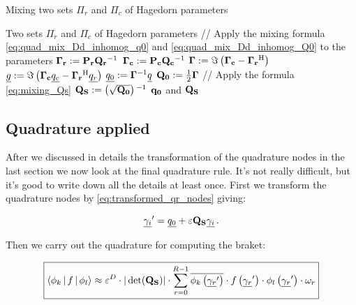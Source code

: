 \begin{algorithm}
\caption{Mixing two sets $\Pi_r$ and $\Pi_c$ of Hagedorn parameters}
\label{al:mixing_hagedorn_parameters}
\begin{algorithmic}
  \REQUIRE Two sets $\Pi_r$ and $\Pi_c$ of Hagedorn parameters
  \STATE // Apply the mixing formula  \eqref{eq:quad_mix_Dd_inhomog_q0} and \eqref{eq:quad_mix_Dd_inhomog_Q0} to the parameters
  \STATE $\mathbf{\Gamma_r} := \mathbf{P_r} \mathbf{Q_r}{}^{-1}$
  \STATE $\mathbf{\Gamma_c} := \mathbf{P_c} \mathbf{Q_c}{}^{-1}$
  \STATE $\mathbf{\Gamma} := \Im \left(\mathbf{\Gamma_c} - \mathbf{\Gamma_r}{}^{\textnormal{H}}\right)$
  \STATE $\underline{g} := \Im \left(\mathbf{\Gamma_c} \underline{q_c} - \mathbf{\Gamma_r}{}^{\textnormal{H}} \underline{q_r}\right)$
  \STATE $\underline{q_0} := \mathbf{\Gamma}{}^{-1} \underline{q}$
  \STATE $\mathbf{Q_0} := \frac{1}{2} \mathbf{\Gamma}$
  \STATE // Apply the formula \eqref{eq:mixing_Qs}
  \STATE $\mathbf{Q_S} := \left(\sqrt{\mathbf{Q_0}}\right){}^{-1}$
  \RETURN $\mathbf{q_0}$ and $\mathbf{Q_S}$
\end{algorithmic}
\end{algorithm}


\subsection{Quadrature applied}


After we discussed in details the transformation of the quadrature nodes in the
last section we now look at the final quadrature rule. It's not really difficult,
but it's good to write down all the details at least once. First we transform the
quadrature nodes by \eqref{eq:transformed_qr_nodes} giving:

\begin{equation} \label{eq:transform_qr_nodes}
  \underline{\gamma_i}^\prime = \underline{q_0} + \varepsilon \mathbf{Q_S} \underline{\gamma_i} \,.
\end{equation}

Then we carry out the quadrature for computing the braket:

\begin{equation}
\boxed{
\begin{split}
  \Braket{\phi_k | f | \phi_l}
  \approx
  \varepsilon^D \cdot |\det(\mathbf{Q_S})| \cdot \sum_{r=0}^{R-1} \overline{\phi_k\left( \underline{\gamma_r}^\prime \right)}
  \cdot f\left( \underline{\gamma_r}^\prime \right) \cdot \phi_l\left( \underline{\gamma_r}^\prime \right) \cdot \omega_r
\end{split}
}
\end{equation}

